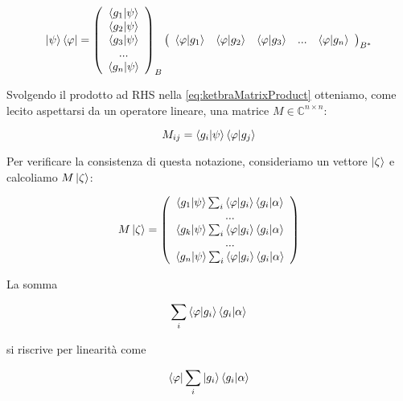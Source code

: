 	\begin{equation} \label{eq:ketbraMatrixProduct}
		\ket{\psi}\bra{\varphi} =
		\left ( \begin{array}{c}
				\braket{g_1}{\psi} \\
				\braket{g_2}{\psi} \\
				\braket{g_3}{\psi} \\
				... \\
				\braket{g_n}{\psi}
			\end{array}
		\right )_B
		\left ( \begin{array}{c c c c c}
			\braket{\varphi}{g_1} & \braket{\varphi}{g_2} & \braket{\varphi}{g_3} & ... & \braket{\varphi}{g_n}
		\end{array} \right )_{B^*}
	\end{equation}

Svolgendo il prodotto ad RHS nella \eqref{eq:ketbraMatrixProduct} otteniamo, come lecito aspettarsi da un operatore lineare, una matrice $M \in \mathbb{C}^{n \times n}$:

	\begin{equation}
		M_{ij} = \braket{g_i}{\psi} \braket{\varphi}{g_j}
	\end{equation}

Per verificare la consistenza di questa notazione, consideriamo un vettore $\ket{\zeta}$ e calcoliamo $M \ket{\zeta}$:

	\begin{equation} \label{eq:matrixDer1}
		M \ket{\zeta} = \left ( \begin{array}{c}
				\braket{g_1}{\psi} \sum_i \braket{\varphi}{g_i} \braket{g_i}{\alpha} \\
				... \\
				\braket{g_k}{\psi} \sum_i \braket{\varphi}{g_i} \braket{g_i}{\alpha} \\
				... \\
				\braket{g_n}{\psi} \sum_i \braket{\varphi}{g_i} \braket{g_i}{\alpha} \\
			\end{array}
		\right )
	\end{equation}

La somma

	\begin{equation}
		\sum_i \braket{\varphi}{g_i} \braket{g_i}{\alpha}
	\end{equation}

si riscrive per linearità come

	\begin{equation} \label{eq:matrixDer2}
		\bra{\varphi} \sum_i \ket{g_i} \braket{g_i}{\alpha}
	\end{equation}


